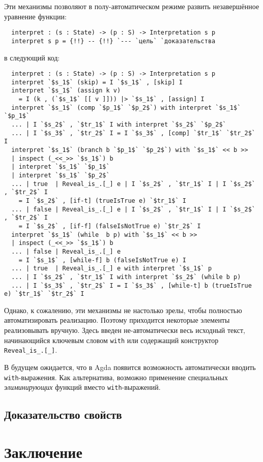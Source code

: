 \documentclass[aps,12pt,final,oneside,onecolumn,musixtex,superscriptaddress,centertags]{article}
\newcommand{\lcode}[1]{\lstinline[basicstyle=\ttfamily\normalsize]{#1}}
\begin{document}
  Эти механизмы позволяют в полу-автоматическом режиме развить незавершённое уравнение функции:
  \begin{lstlisting}
  interpret : (s : State) -> (p : S) -> Interpretation s p
  interpret s p = {!!} -- {!!} `--- `цель` `доказательства
  \end{lstlisting}
  в следующий код:
  \begin{lstlisting}
  interpret : (s : State) -> (p : S) -> Interpretation s p
  interpret `$s_1$` (skip) = I `$s_1$` , [skip] I
  interpret `$s_1$` (assign k v)
    = I (k , (`$s_1$` [[ v ]])) |> `$s_1$` , [assign] I
  interpret `$s_1$` (comp `$p_1$` `$p_2$`) with interpret `$s_1$` `$p_1$`
  ... | I `$s_2$` , `$tr_1$` I with interpret `$s_2$` `$p_2$`
  ... | I `$s_3$` , `$tr_2$` I = I `$s_3$` , [comp] `$tr_1$` `$tr_2$` I
  interpret `$s_1$` (branch b `$p_1$` `$p_2$`) with `$s_1$` << b >>
  | inspect (_<<_>> `$s_1$`) b
  | interpret `$s_1$` `$p_1$`
  | interpret `$s_1$` `$p_2$`
  ... | true  | Reveal_is_.[_] e | I `$s_2$` , `$tr_1$` I | I `$s_2$` , `$tr_2$` I
    = I `$s_2$` , [if-t] (trueIsTrue e) `$tr_1$` I
  ... | false | Reveal_is_.[_] e | I `$s_2$` , `$tr_1$` I | I `$s_2$` , `$tr_2$` I
    = I `$s_2$` , [if-f] (falseIsNotTrue e) `$tr_2$` I
  interpret `$s_1$` (while  b p) with `$s_1$` << b >>
  | inspect (_<<_>> `$s_1$`) b
  ... | false | Reveal_is_.[_] e
    = I `$s_1$` , [while-f] b (falseIsNotTrue e) I
  ... | true  | Reveal_is_.[_] e with interpret `$s_1$` p
  ... | I `$s_2$` , `$tr_1$` I with interpret `$s_2$` (while b p)
  ... | I `$s_3$` , `$tr_2$` I = I `$s_3$` , [while-t] b (trueIsTrue e) `$tr_1$` `$tr_2$` I
  \end{lstlisting}
  Однако, к сожалению, эти механизмы не настолько зрелы, чтобы полностью автоматизировать реализацию. Поэтому приходится некоторые элементы реализовывать вручную. Здесь введен не-автоматически весь исходный текст, начинающийся ключевым словом \lcode{with} или содержащий конструктор \lcode{Reveal_is_.[_]}.

  В будущем ожидается, что в Agda появится возможность автоматически вводить \lcode{with}-выражения. Как альтернатива, возможно применение специальных \emph{элиминирующих} функций вместо \lcode{with}-выражений.

  \subsection{Доказательство свойств}

  \newpage
  \section*{Заключение}

  
  
\end{document}
